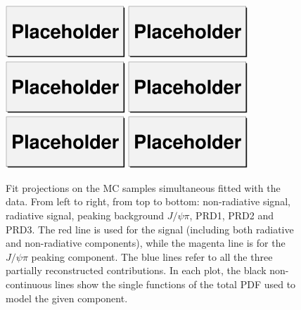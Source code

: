 \begin{figure}[!htb]
    \begin{center}
	\hspace{-0.5cm}
	\includegraphics[width=0.40\textwidth]{mcfitsigN3.eps}
	\hspace{-0.5cm}
	\includegraphics[width=0.40\textwidth]{mcfitradsigN3.eps}
	\hspace{-0.5cm}
	\includegraphics[width=0.40\textwidth]{mcfitjpsipiN3.eps}
	\hspace{-0.5cm}
	\includegraphics[width=0.40\textwidth]{mcfitprd1N3.eps}
	\hspace{-0.5cm}
	\includegraphics[width=0.40\textwidth]{mcfitprd2N3.eps}
	\hspace{-0.5cm}
	\includegraphics[width=0.40\textwidth]{mcfitprd3N3.eps}
	\caption{Fit projections on the MC samples simultaneous fitted with the data.
	    From left to right, from top to bottom: non-radiative \BpmKpmJpsi{} signal, 
	    radiative \BpmKpmJpsi{} signal, peaking background $J/\psi \pi$, PRD1, PRD2
	    and PRD3.
	    The red line is used for the \BpmKpmJpsi{} signal (including both radiative
	    and non-radiative components), while the magenta line is for the
	    $J/\psi\pi$ peaking component. The blue lines refer to all the three
	    partially reconstructed contributions.
	    In each plot, the black non-continuous lines show the single functions
	of the total PDF used to model the given component.}
	\label{fig:bplusfitN3all}
    \end{center}
\end{figure}

